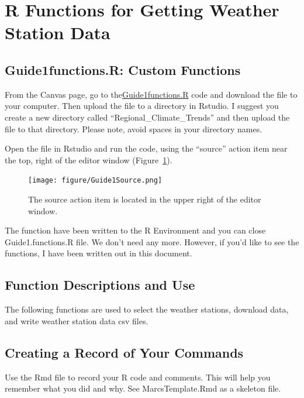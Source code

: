 \documentclass{article}\usepackage[]{graphicx}\usepackage[dvipsnames]{xcolor}
\begin{document}
\section{R Functions for Getting Weather Station Data}

\subsection{Guide1functions.R: Custom Functions}




From the Canvas page, go to the\href{https://github.com/marclos/RTricks/blob/master/04_Regional_Climate_Trends/Guides/Guide1functions.R}{Guide1functions.R} code and download the file to your computer. Then upload the file to a directory in Rstudio. I suggest you create a new directory called ``Regional\_Climate\_Trends'' and then upload the file to that directory. Please note, avoid spaces in your directory names.

Open the file in Rstudio and run the code, using the ``source'' action item near the top, right of the editor window (Figure~\ref{fig:source_code}).

\begin{figure}[h]
\centering
\texttt{[image: figure/Guide1Source.png]}
\caption{The source action item is located in the upper right of the editor window.}
\label{fig:source_code}
\end{figure}

The function have been written to the R Environment and you can close Guide1.functions.R file. We don't need any more. However, if you'd like to see the functions, I have been written out in this document. 

\subsection{Function Descriptions and Use}

The following functions are used to select the weather stations, download data, and write weather station data csv files.

\subsection{Creating a Record of Your Commands}

Use the Rmd file to record your R code and comments. This will help you remember what you did and why. See MarcsTemplate.Rmd as a skeleton file. 
\end{document}
